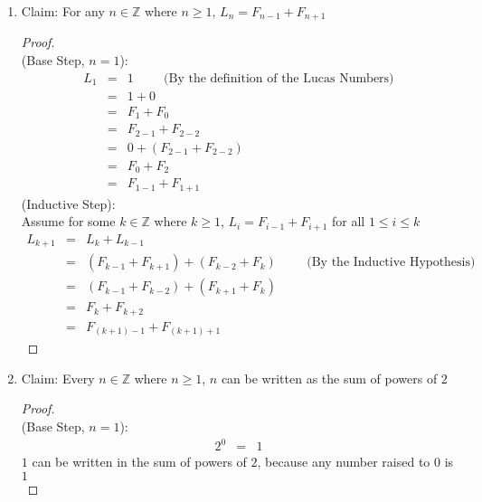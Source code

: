 \documentclass{article}
\begin{document}
\begin{enumerate}
\begin{proof}
\begin{eqnarray}
            &=& 3(a-b) \hspace{1cm} \text{($3(a-b)$ is divisible by $3$ because $3$ and $a-b \in \mathbb{Z}$, so $3(a-b) \in \mathbb{Z}$)}
        \end{eqnarray}
    \end{proof}
    \item Claim: For any $n \in \mathbb{Z}$ where $n \geq 1$, $L_n = F_{n-1} + F_{n+1}$
    \begin{proof}
        \text{} \\
        (Base Step, $n = 1$):
        \begin{eqnarray}
            L_1 &=& 1 \hspace{1cm} \text{(By the definition of the Lucas Numbers)} \\
            &=& 1 + 0 \\
            &=& F_1 + F_0 \\
            &=& F_{2 - 1} + F_{2-2} \\
            &=& 0 + (F_{2 - 1} + F_{2-2}) \\
            &=& F_0 + F_2 \\
            &=& F_{1-1} + F_{1+1}
        \end{eqnarray}
        (Inductive Step): \\
        Assume for some $k \in \mathbb{Z}$ where $k \geq 1$, $L_i = F_{i - 1} + F_{i + 1}$ for all $1 \leq i \leq k$
        \begin{eqnarray}
            L_{k+1} &=& L_k + L_{k-1} \\
            &=& (F_{k-1} + F_{k+1}) + (F_{k-2} + F_k) \hspace{1cm} \text{(By the Inductive Hypothesis)} \\
            &=& (F_{k-1} + F_{k-2}) + (F_{k+1} + F_k) \\
            &=& F_k + F_{k+2} \\
            &=& F_{(k+1)-1} + F_{(k+1)+1}
        \end{eqnarray}
    \end{proof}
    \item Claim: Every $n \in \mathbb{Z}$ where $n \geq 1$, $n$ can be written as the sum of powers of $2$
    \begin{proof}
        \text{} \\
        (Base Step, $n = 1$):
        \begin{eqnarray}
            2^0 &=& 1
        \end{eqnarray}
        $1$ can be written in the sum of powers of $2$, because any number raised to $0$ is $1$ \\

\end{proof}
\end{enumerate}
\end{document}
